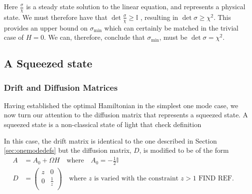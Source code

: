 \documentclass[11pt,a4paper]{article}
\numberwithin{equation}{section}
\begin{document}
	Here $\frac{\sigma}{\chi}$ is a steady state solution to the linear equation, and represents a physical state. We must therefore have that $\det\frac{\sigma}{\chi} \geq \mathbb{I}$ \cite{Adesso14}, resulting in $\det \sigma \geq \chi^2$. This provides an upper bound on $\sigma_\text{min}$ which can certainly be matched in the trivial case of $H=0$. We can, therefore, conclude that $\sigma_\text{min}$, must be $\det \sigma = \chi^2$.

	
	\iffalse
	\subsection{A Squeezed state}
	\subsubsection{Drift and Diffusion Matrices}
	Having established the optimal Hamiltonian in the simplest one mode case, we now turn our attention to the diffusion matrix that represents a squeezed state. A squeezed state is a non-classical state of light that \color{blue} check definition \color{black}
	
	In this case, the drift matrix is identical to the one described in Section \ref{sec:onemodedefs} but the diffusion matrix, $D$, is modified to be of the form
	\begin{align*}
	A &= A_0 + \Omega H \quad\text{where}\quad A_0 = -\frac{1}{2}\mathbb{I}&\\
	D &= \begin{pmatrix}
	z & 0  \\
	0 & \frac{1}{z}\\
	\end{pmatrix} \quad\text{where $z$ is varied with the constraint $z>1$ FIND REF}.&
	\end{align*} 
	
\end{document}
